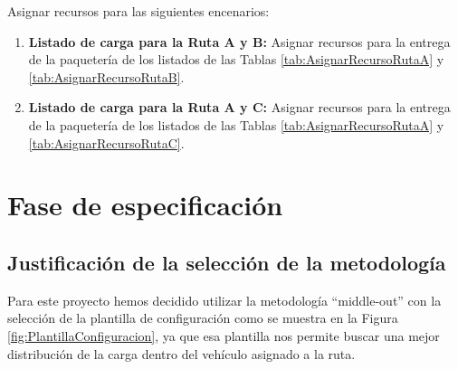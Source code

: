 \begin{table}[H]
  \centering
	\caption{\label{tab:AsignarRecursoRutaC}Lista de paquetes asignados a la Ruta C}
\end{table}

Asignar recursos para las siguientes encenarios:
\begin{enumerate}
	\item  \textbf{Listado de carga para la Ruta A y B:} Asignar recursos para la entrega de la paquetería de los listados de las Tablas \ref{tab:AsignarRecursoRutaA} y \ref{tab:AsignarRecursoRutaB}.
	\item  \textbf{Listado de carga para la Ruta A y C:} Asignar recursos para la entrega de la paquetería de los listados de las Tablas \ref{tab:AsignarRecursoRutaA} y \ref{tab:AsignarRecursoRutaC}.
\end{enumerate}

\section{Fase de especificación}
\subsection{Justificación de la selección de la metodología}
Para este proyecto hemos decidido utilizar la metodología ``middle-out'' con la selección de la plantilla de configuración como se muestra en la Figura \ref{fig:PlantillaConfiguracion}, ya que esa plantilla nos permite buscar una mejor distribución de la carga dentro del vehículo asignado a la ruta. 

